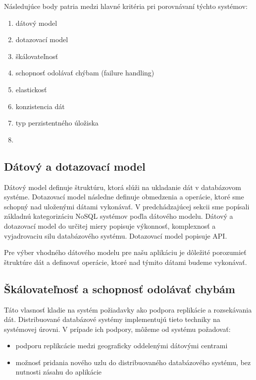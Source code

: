 \documentclass[11pt,twoside,a4paper]{book}
\begin{document}

Následujúce body patria medzi hlavné kritéria pri porovnávaní týchto systémov:
\begin{enumerate}
 \item
  dátový model
 \item 
  dotazovací model
 \item
  škálovateľnosť
 \item 
  schopnosť odolávať chýbam (failure handling)
 \item
  elastickosť
 \item 
  konzistencia dát
 \item
  typ perzistentného úložiska
 \item 
  
\end{enumerate}

\subsection{Dátový a dotazovací model}
Dátový model definuje štruktúru, ktorá slúži na ukladanie dát v databázovom systéme. Dotazovací model následne definuje obmedzenia a operácie, ktoré sme schopný nad uloženými dátami vykonávať. V predchádzajúcej sekcii sme popísali základnú kategorizáciu NoSQL systémov poďla dátového modelu. Dátový a dotazovací model do určitej miery popisuje výkonnosť, komplexnosť a vyjadrovaciu silu databázového systému. Dotazovací model popisuje API.

Pre výber vhodného dátového modelu pre našu aplikáciu je dôležité porozumieť štruktúre dát a definovať operácie, ktoré nad týmito dátami budeme vykonávať.

\subsection{Škálovateľnosť a schopnosť odolávať chybám}
Táto vlasnosť kladie na systém požiadavky ako podpora replikácie a rozsekávania dát. Distribuované databázové systémy implementujú tieto techniky na systémovej úrovni. V prípade ich podpory, môžeme od systému požadovať:
\begin{itemize}
  \item
  podporu replikcácie medzi geograficky oddelenými dátovými centrami
  \item
  možnosť pridania nového uzlu do distribuovaného databázového systému, bez nutnosti zásahu do aplikácie
\end{itemize}
\end{document}
